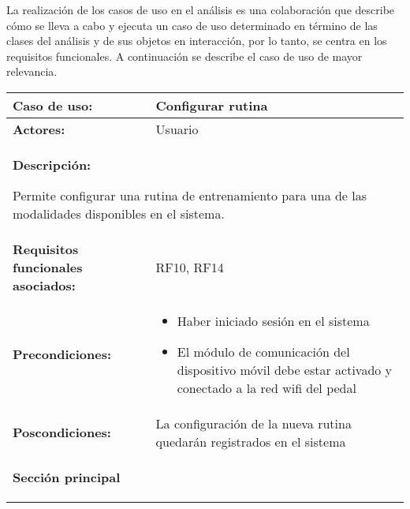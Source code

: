 La realización de los casos de uso en el análisis es una colaboración que describe cómo se lleva a cabo y ejecuta un caso de uso determinado en término de las clases del análisis y de sus objetos en interacción, por lo tanto, se centra en los requisitos funcionales. A continuación se describe el caso de uso de mayor relevancia.

\begin{table}
    \vspace*{-70pt}
    \hspace*{-20pt}
    \begin{tabularx}{1.1\textwidth}{|X|X|}
        \hline
        \textbf{Caso de uso:} & Configurar rutina \\\hline
        \textbf{Actores:}     & Usuario \\\hline
        
        \multicolumn{2}{|X|}{        
        \begin{minipage}[t]{0.950\columnwidth}
            \textbf{Descripción:}

            Permite configurar una rutina de entrenamiento para una de las modalidades disponibles en el sistema.
        \end{minipage}} \\\hline
        
        \textbf{Requisitos funcionales asociados:} &  RF10, RF14\\\hline
        \textbf{Precondiciones:} & \begin{itemize}
                                        \item Haber iniciado sesión en el sistema
                                        \item El módulo de comunicación del dispositivo móvil debe estar activado y conectado a la red wifi del pedal
                                        \end{itemize}\\\hline
        \textbf{Poscondiciones:} & La configuración de la nueva rutina quedarán registrados en el sistema \\\hline
        
        \multicolumn{2}{|X|}{        
        \begin{minipage}[t]{0.925\columnwidth}
            \begin{center}
                \textbf{Sección principal}
            \end{center}
        \end{minipage}} \\\hline
        

\end{tabularx}
\end{table}
